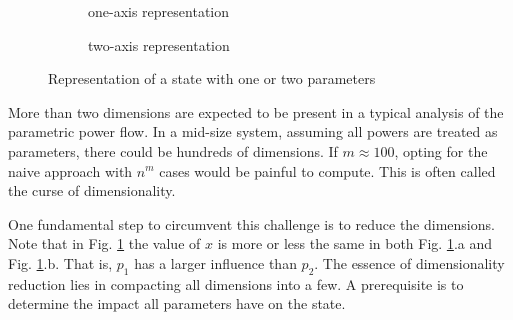 
\begin{figure}[!htb]
\begin{subfigure}{0.4\textwidth}
  \vspace{1.13cm}
\caption{one-axis representation}
\end{subfigure}
  \hspace{0.2cm}
\begin{subfigure}{0.6\textwidth}
\caption{two-axis representation}
\end{subfigure}
\caption{Representation of a state with one or two parameters}
\label{fig:1ax}
\end{figure}

More than two dimensions are expected to be present in a typical analysis of the parametric power flow. In a mid-size system, assuming all powers are treated as parameters, there could be hundreds of dimensions. If $m \approx 100$, opting for the naive approach with $n^m$ cases would be painful to compute. This is often called the curse of dimensionality. 

One fundamental step to circumvent this challenge is to reduce the dimensions. Note that in Fig. \ref{fig:1ax} the value of $x$ is more or less the same in both Fig. \ref{fig:1ax}.a and Fig. \ref{fig:1ax}.b. That is, $p_1$ has a larger influence than $p_2$. The essence of dimensionality reduction lies in compacting all dimensions into a few. A prerequisite is to determine the impact all parameters have on the state.  

